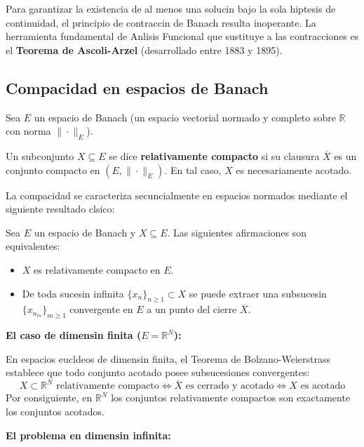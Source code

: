 Para garantizar la existencia de al menos una solucin bajo la sola hiptesis de continuidad, el principio de contraccin de Banach resulta inoperante. La herramienta fundamental de Anlisis Funcional que sustituye a las contracciones es el \textbf{Teorema de Ascoli-Arzel} (desarrollado entre 1883 y 1895).

\subsection{Compacidad en espacios de Banach}

Sea $E$ un espacio de Banach (un espacio vectorial normado y completo sobre $\mathbb{R}$ con norma $\|\cdot\|_E$).

\begin{definicin}
    Un subconjunto $X \subseteq E$ se dice \textbf{relativamente compacto} si su clausura $\overline{X}$ es un conjunto compacto en $(E, \|\cdot\|_E)$. En tal caso, $X$ es necesariamente acotado.
\end{definicin}

La compacidad se caracteriza secuncialmente en espacios normados mediante el siguiente resultado clsico:

\begin{teorema}
    Sea $E$ un espacio de Banach y $X \subseteq E$. Las siguientes afirmaciones son equivalentes:
    \begin{itemize}
        \item $X$ es relativamente compacto en $E$.
        \item De toda sucesin infinita $\{x_n\}_{n \geq 1} \subset X$ se puede extraer una subsucesin $\{x_{n_m}\}_{m \geq 1}$ convergente en $E$ a un punto del cierre $\overline{X}$.
    \end{itemize}
\end{teorema}

\textbf{El caso de dimensin finita ($E = \mathbb{R}^N$):}

En espacios eucldeos de dimensin finita, el Teorema de Bolzano-Weierstrass establece que todo conjunto acotado posee subsucesiones convergentes:
\[
    X \subset \mathbb{R}^N \text{ relativamente compacto} \iff \overline{X} \text{ es cerrado y acotado} \iff X \text{ es acotado}
\]
Por consiguiente, en $\mathbb{R}^N$ los conjuntos relativamente compactos son exactamente los conjuntos acotados.

\medskip

\textbf{El problema en dimensin infinita:}

